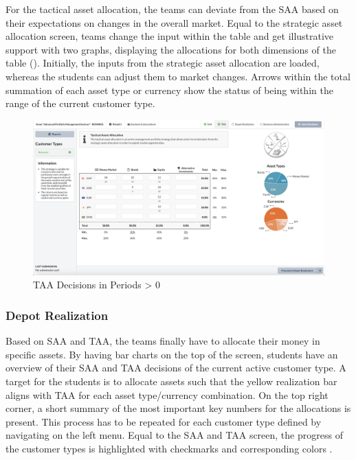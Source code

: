 For the tactical asset allocation, the teams can deviate from the SAA based on their expectations on changes in the overall market. Equal to the strategic asset allocation screen, teams change the input within the table and get illustrative support with two graphs, displaying the allocations for both dimensions of the table (). Initially, the inputs from the strategic asset allocation are loaded, whereas the students can adjust them to market changes. Arrows within the total summation of each asset type or currency show the status of being within the range of the current customer type.
\begin{figure}[h!]
  \centering
  \includegraphics[scale=0.2]{img/application-overview/teams/04_taa.png}
  \caption{TAA Decisions in Periods > 0}
  \label{fig:taa_decisions}
\end{figure}

\subsubsection{Depot Realization}
Based on SAA and TAA, the teams finally have to allocate their money in specific assets. By having bar charts on the top of the screen, students have an overview of their SAA and TAA decisions of the current active customer type. A target for the students is to allocate assets such that the yellow realization bar aligns with TAA for each asset type/currency combination. On the top right corner, a short summary of the most important key numbers for the allocations is present. This process has to be repeated for each customer type defined by navigating on the left menu. Equal to the SAA and TAA screen, the progress of the customer types is highlighted with checkmarks and corresponding colors .

